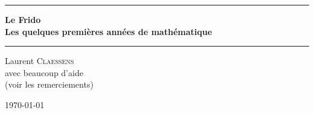 

\thispagestyle{empty}
\begin{center}
	\begin{minipage}{15cm}
		\hrule\par
		\vspace{2mm}
		\begin{center}
			\Huge \bfseries Le Frido \\  {\small Les quelques premières années de mathématique}
			\normalsize
		\end{center}
		\hrule\par
	\end{minipage}
\end{center}

\vspace{2cm}

\begin{center}
	Laurent \textsc{Claessens} \\
	\vspace{0.5cm}
	avec beaucoup d'aide \\
	(voir les remerciements)

	\vspace{1cm}

	\today\\
	\texttt{\GitCommitHexsha}


\end{center}

\vfill

\LogoEtLicence

\newpage



